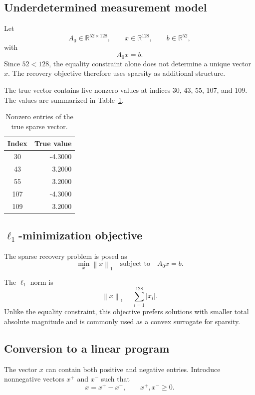 \documentclass[11pt]{article}
\newcommand{\R}{\mathbb{R}}
\newcommand{\norm}[1]{\left\lVert #1 \right\rVert}
\begin{document}
\subsection{Underdetermined measurement model}

Let
\[
A_0\in\R^{52\times 128},\qquad x\in\R^{128},\qquad b\in\R^{52},
\]
with
\[
A_0x=b.
\]
Since $52<128$, the equality constraint alone does not determine a unique vector $x$. The recovery objective therefore uses sparsity as additional structure.

The true vector contains five nonzero values at indices 30, 43, 55, 107, and 109. The values are summarized in Table~\ref{tab:true-support}.

\begin{table}[H]
\centering
\caption{Nonzero entries of the true sparse vector.}
\label{tab:true-support}
\begin{tabular}{cr}
\toprule
\textbf{Index} & \textbf{True value} \\
\midrule
30  & -4.3000 \\
43  &  3.2000 \\
55  &  3.2000 \\
107 & -4.3000 \\
109 &  3.2000 \\
\bottomrule
\end{tabular}
\end{table}

\subsection{$\ell_1$-minimization objective}

The sparse recovery problem is posed as
\begin{equation}
\label{eq:l1-problem}
\min_x \norm{x}_1
\quad\text{subject to}\quad
A_0x=b.
\end{equation}

The $\ell_1$ norm is
\[
\norm{x}_1=\sum_{i=1}^{128}|x_i|.
\]
Unlike the equality constraint, this objective prefers solutions with smaller total absolute magnitude and is commonly used as a convex surrogate for sparsity.

\subsection{Conversion to a linear program}

The vector $x$ can contain both positive and negative entries. Introduce nonnegative vectors $x^+$ and $x^-$ such that
\begin{equation}
\label{eq:split}
x=x^+-x^-,
\qquad
x^+,x^-\ge 0.
\end{equation}
\end{document}
